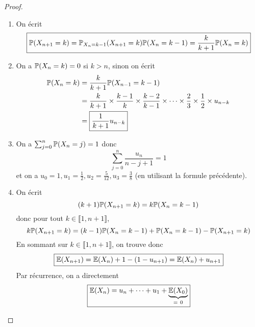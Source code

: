 \documentclass[12pt]{article}
\begin{document}
\begin{proof}
    \phantom{}
    \begin{enumerate}
        \item On écrit 
        \begin{equation}
            \boxed{\P(X_{n+1}=k)=\P_{X_{n}=k-1}(X_{n+1}=k)\P(X_{n}=k-1)=\frac{k}{k+1}\P(X_{n}=k)}
        \end{equation}

        \item On a $\P(X_{n}=k)=0$ si $k>n$, sinon on écrit 
        \begin{align}
            \P(X_{n}=k)
            &=\frac{k}{k+1}\P(X_{n-1}=k-1)\\
            &=\frac{k}{k+1}\times\frac{k-1}{k}\times\frac{k-2}{k-1}\times\dots\times\frac{2}{3}\times\frac{1}{2}\times u_{n-k}\\
            &=\boxed{\frac{1}{k+1}u_{n-k}}
        \end{align}

        \item On a $\sum_{j=0}^{n}\P(X_{n}=j)=1$ donc 
        \begin{equation}
            \boxed{\sum_{j=0}^{n}\frac{u_{n}}{n-j+1}=1}
        \end{equation}
        et on a $u_{0}=1,u_{1}=\frac{1}{2},u_{2}=\frac{5}{12},u_{3}=\frac{3}{8}$ (en utilisant la formule précédente).

        \item On écrit 
        \begin{equation}
            (k+1)\P(X_{n+1}=k)=k\P(X_{n}=k-1)
        \end{equation}
        donc pour tout $k\in\llbracket1,n+1\rrbracket$, 
        \begin{equation}
            k\P(X_{n+1}=k)=(k-1)\P(X_{n}=k-1)+\P(X_{n}=k-1)-\P(X_{n+1}=k)
        \end{equation}
        En sommant sur $k\in\llbracket1,n+1\rrbracket$, on trouve donc 
        \begin{equation}
            \boxed{\E(X_{n+1})=\E(X_{n})+1-(1-u_{n+1})=\E(X_{n})+u_{n+1}}
        \end{equation}
        Par récurrence, on a directement 
        \begin{equation}
            \boxed{\E(X_{n})=u_{n}+\dots+u_{1}+\underbrace{\E(X_{0})}_{{=~0}}}
        \end{equation}


\end{enumerate}
\end{proof}
\end{document}
